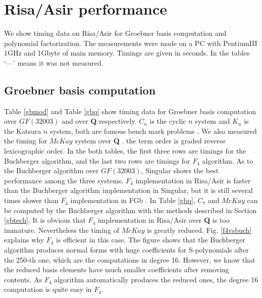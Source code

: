 \documentclass[runningheads]{cl2emult}
\begin{document}

\section{Risa/Asir performance}

We show timing data on Risa/Asir for Groebner basis computation
and polynomial factorization. The measurements were made on
a PC with PentiumIII 1GHz and 1Gbyte of main memory. Timings
are given in seconds. In the tables `---' means it was not
measured.

\subsection{Groebner basis computation}

Table \ref{gbmod} and Table \ref{gbq} show timing data for Groebner
basis computation over $GF(32003)$ and over {\bf Q} respectively.
$C_n$ is the cyclic $n$ system and $K_n$ is the Katsura $n$ system,
both are famous bench mark problems \cite{BENCH}.  We also measured
the timing for $McKay$ system over {\bf Q} \cite{REPL}.  the term
order is graded reverse lexicographic order.  In the both tables, the
first three rows are timings for the Buchberger algorithm, and the
last two rows are timings for $F_4$ algorithm. As to the Buchberger
algorithm over $GF(32003)$, Singular\cite{SINGULAR} shows the best
performance among the three systems. $F_4$ implementation in Risa/Asir
is faster than the Buchberger algorithm implementation in Singular,
but it is still several times slower than $F_4$ implementation in FGb
\cite{FGB}.  In Table \ref{gbq}, $C_7$ and $McKay$ can be computed by
the Buchberger algorithm with the methods described in Section
\ref{gbtech}.  It is obvious that $F_4$ implementation in Risa/Asir
over {\bf Q} is too immature. Nevertheless the timing of $McKay$ is
greatly reduced.  Fig. \ref{f4vsbuch} explains why $F_4$ is efficient
in this case.  The figure shows that the Buchberger algorithm produces
normal forms with huge coefficients for S-polynomials after the 250-th
one, which are the computations in degree 16.  However, we know that
the reduced basis elements have much smaller coefficients after
removing contents.  As $F_4$ algorithm automatically produces the
reduced ones, the degree 16 computation is quite easy in $F_4$.
\end{document}
